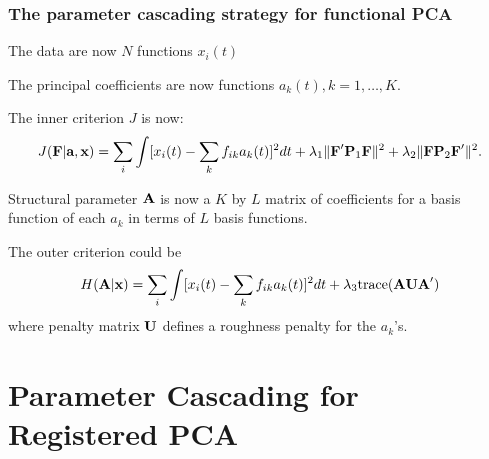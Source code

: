 \documentclass[11pt]{beamer}
\begin{document}
\begin{frame}

\frametitle{The parameter cascading strategy for functional PCA}

\bi
  \item The data are now $N$ functions $x_i(t)$
  \item The principal coefficients are now functions $a_k(t), k=1,\ldots,K$.
  \item The inner criterion $J$ is now:
  \[
    J(\mbox{\bf F}|\mbox{\bf a},\mbox{\bf x}) = \sum_i \int [x_i(t) - \sum_k f_{ik} a_k(t)]^2 dt +
              \lambda_1 \| \mbox{\bf F}' \mbox{\bf P}_1 \mbox{\bf F} \|^2 + \lambda_2 \| \mbox{\bf F}  \mbox{\bf P}_2 \mbox{\bf F}' \|^2.
  \]
  \item Structural parameter $\mbox{\bf A}$ is now a $K$ by $L$ matrix of coefficients for a basis function of each $a_k$ in terms of $L$ basis functions.
\ei

\end{frame}


\begin{frame}

\bi
  \item The outer criterion could be
  \[
    H(\mbox{\bf A}|\mbox{\bf x}) = \sum_i \int [x_i(t) - \sum_k f_{ik} a_k(t)]^2 dt + \lambda_3 \mbox{trace}(\mbox{\bf A} \mbox{\bf U} \mbox{\bf A}')
  \]
  where penalty matrix $\mbox{\bf U}$ defines a roughness penalty for the $a_k$'s.
\ei

\end{frame}


\section{Parameter Cascading for Registered PCA}


\end{document}
